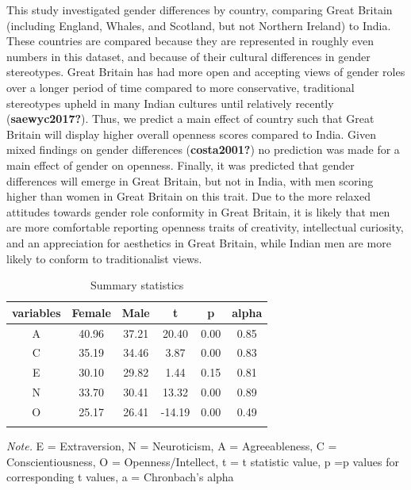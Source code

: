 \documentclass[
  english,
  man, fleqn, noextraspace]{apa6}
\begin{document}
This study investigated gender differences by country, comparing Great Britain (including England, Whales, and Scotland, but not Northern Ireland) to India. These countries are compared because they are represented in roughly even numbers in this dataset, and because of their cultural differences in gender stereotypes. Great Britain has had more open and accepting views of gender roles over a longer period of time compared to more conservative, traditional stereotypes upheld in many Indian cultures until relatively recently (\textbf{saewyc2017?}). Thus, we predict a main effect of country such that Great Britain will display higher overall openness scores compared to India. Given mixed findings on gender differences (\textbf{costa2001?}) no prediction was made for a main effect of gender on openness. Finally, it was predicted that gender differences will emerge in Great Britain, but not in India, with men scoring higher than women in Great Britain on this trait. Due to the more relaxed attitudes towards gender role conformity in Great Britain, it is likely that men are more comfortable reporting openness traits of creativity, intellectual curiosity, and an appreciation for aesthetics in Great Britain, while Indian men are more likely to conform to traditionalist views.

\begin{table}[tbp]

\begin{center}
\begin{threeparttable}

\caption{\label{tab:descriptiveTable}Summary statistics}

\begin{tabular}{cccccc}
\toprule
variables & \multicolumn{1}{c}{Female} & \multicolumn{1}{c}{Male} & \multicolumn{1}{c}{t} & \multicolumn{1}{c}{p} & \multicolumn{1}{c}{alpha}\\
\midrule
A & 40.96 & 37.21 & 20.40 & 0.00 & 0.85\\
C & 35.19 & 34.46 & 3.87 & 0.00 & 0.83\\
E & 30.10 & 29.82 & 1.44 & 0.15 & 0.81\\
N & 33.70 & 30.41 & 13.32 & 0.00 & 0.89\\
O & 25.17 & 26.41 & -14.19 & 0.00 & 0.49\\
\bottomrule
\addlinespace
\end{tabular}

\begin{tablenotes}[para]
\normalsize{\textit{Note.} E = Extraversion, N = Neuroticism, A = Agreeableness, C = Conscientiousness, O = Openness/Intellect, t = t statistic value, p =p values for corresponding t values, a = Chronbach's alpha}
\end{tablenotes}

\end{threeparttable}
\end{center}

\end{table}
\end{document}
